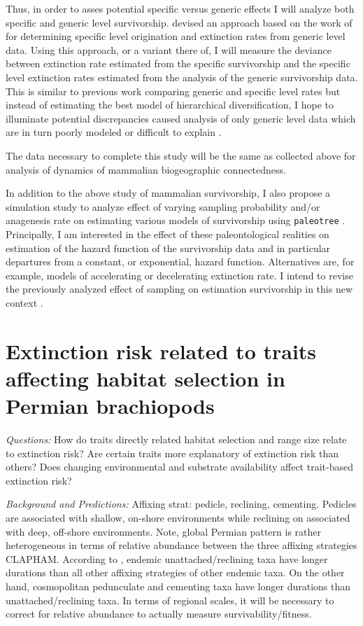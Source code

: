 \documentclass[12pt,letterpaper]{article}
\begin{document}
Thus, in order to asses potential specific versus generic effects I will analyze both specific and generic level survivorship. \citet{Foote1988} devised an approach based on the work of \citet{Raup1985} for determining specific level origination and extinction rates from generic level data. Using this approach, or a variant there of, I will measure the deviance between extinction rate estimated from the specific survivorship and the specific level extinction rates estimated from the analysis of the generic survivorship data. This is similar to previous work comparing generic and specific level rates \citet{Simpson2006} but instead of estimating the best model of hierarchical diversification, I hope to illuminate potential discrepancies caused analysis of only generic level data which are in turn poorly modeled or difficult to explain \citep{Liow2008,Tomiya2013,Simpson2006}.

The data necessary to complete this study will be the same as collected above for analysis of dynamics of mammalian biogeographic connectedness.

In addition to the above study of mammalian survivorship, I also propose a simulation study to analyze effect of varying sampling probability and/or anagenesis rate on estimating various models of survivorship using \texttt{paleotree} \citep{Bapst2012a}. Principally, I am interested in the effect of these paleontological realities on estimation of the hazard function of the survivorship data and in particular departures from a constant, or exponential, hazard function. Alternatives are, for example, models of accelerating or decelerating extinction rate. I intend to revise the previously analyzed effect of sampling on estimation survivorship in this new context \citep{Sepkoski1975}.


\section{Extinction risk related to traits affecting habitat selection in Permian brachiopods}

\textit{Questions:} How do traits directly related habitat selection and range size relate to extinction risk? Are certain traits more explanatory of extinction risk than others? Does changing environmental and substrate availability affect trait-based extinction risk?

\textit{Background and Predictions:}
Affixing strat: pedicle, reclining, cementing. Pedicles are associated with shallow, on-shore environments while reclining on associated with deep, off-shore environments. Note, global Permian pattern is rather heterogeneous in terms of relative abundance between the three affixing strategies CLAPHAM. According to \citet{Alexander1977}, endemic unattached/reclining taxa have longer durations than all other affixing strategies of other endemic taxa. On the other hand, cosmopolitan pedunculate and cementing taxa have longer durations than unattached/reclining taxa. In terms of regional scales, it will be necessary to correct for relative abundance to actually measure survivability/fitness.
\end{document}
